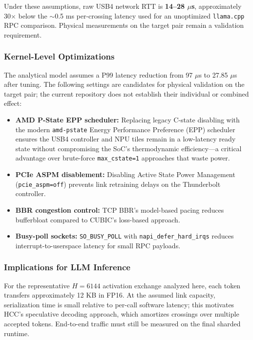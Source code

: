 \documentclass[11pt,a4paper]{article}
\begin{document}
\noindent Under these assumptions, raw USB4 network RTT is \textbf{14--28 $\mu$s}, approximately 30$\times$ below the $\sim$0.5 ms per-crossing latency used for an unoptimized \texttt{llama.cpp} RPC comparison. Physical measurements on the target pair remain a validation requirement.

\subsubsection{Kernel-Level Optimizations}
The analytical model assumes a P99 latency reduction from 97 $\mu$s to 27.85 $\mu$s after tuning. The following settings are candidates for physical validation on the target pair; the current repository does not establish their individual or combined effect:
\begin{itemize}[nosep]
    \item \textbf{AMD P-State EPP scheduler:} Replacing legacy C-state disabling with the modern \texttt{amd-pstate} Energy Performance Preference (EPP) scheduler ensures the USB4 controller and NPU tiles remain in a low-latency ready state without compromising the SoC's thermodynamic efficiency---a critical advantage over brute-force \texttt{max\_cstate=1} approaches that waste power.
    \item \textbf{PCIe ASPM disablement:} Disabling Active State Power Management (\texttt{pcie\_aspm=off}) prevents link retraining delays on the Thunderbolt controller.
    \item \textbf{BBR congestion control:} TCP BBR's model-based pacing reduces bufferbloat compared to CUBIC's loss-based approach.
    \item \textbf{Busy-poll sockets:} \texttt{SO\_BUSY\_POLL} with \texttt{napi\_defer\_hard\_irqs} reduces interrupt-to-userspace latency for small RPC payloads.
\end{itemize}

\subsubsection{Implications for LLM Inference}
For the representative $H=6144$ activation exchange analyzed here, each token transfers approximately 12 KB in FP16. At the assumed link capacity, serialization time is small relative to per-call software latency; this motivates HCC's speculative decoding approach, which amortizes crossings over multiple accepted tokens. End-to-end traffic must still be measured on the final sharded runtime.
\end{document}
